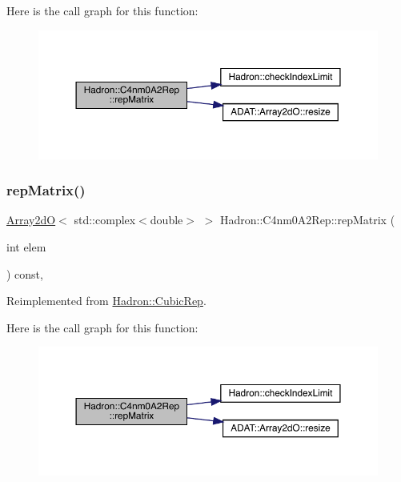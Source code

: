 Here is the call graph for this function\+:
\nopagebreak
\begin{figure}[H]
\begin{center}
\leavevmode
\includegraphics[width=350pt]{d2/db9/structHadron_1_1C4nm0A2Rep_aac52fe57a274d94bbaef9c6b2699e1c9_cgraph}
\end{center}
\end{figure}
\mbox{\label{structHadron_1_1C4nm0A2Rep_aac52fe57a274d94bbaef9c6b2699e1c9}} 
\subsubsection{\texorpdfstring{repMatrix()}{repMatrix()}\hspace{0.1cm}{\footnotesize\ttfamily [2/3]}}
{\footnotesize\ttfamily \mbox{\hyperlink{classADAT_1_1Array2dO}{Array2dO}}$<$ std\+::complex$<$double$>$ $>$ Hadron\+::\+C4nm0\+A2\+Rep\+::rep\+Matrix (\begin{DoxyParamCaption}\item[{int}]{elem }\end{DoxyParamCaption}) const\hspace{0.3cm}{\ttfamily [inline]}, {\ttfamily [virtual]}}



Reimplemented from \mbox{\hyperlink{structHadron_1_1CubicRep_ac5d7e9e6f4ab1158b5fce3e4ad9e8005}{Hadron\+::\+Cubic\+Rep}}.

Here is the call graph for this function\+:
\nopagebreak
\begin{figure}[H]
\begin{center}
\leavevmode
\includegraphics[width=350pt]{d2/db9/structHadron_1_1C4nm0A2Rep_aac52fe57a274d94bbaef9c6b2699e1c9_cgraph}
\end{center}
\end{figure}
\mbox{\label{structHadron_1_1C4nm0A2Rep_aac52fe57a274d94bbaef9c6b2699e1c9}} 
